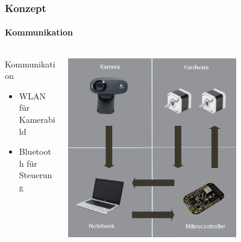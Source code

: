 \begin{frame}
    \frametitle{Konzept}
    \framesubtitle{Kommunikation}
    \begin{columns}
        \begin{column}{0.4\textwidth}
            \begin{block}{Kommunikation}
                \begin{itemize}
                    \item WLAN für Kamerabild
                    \item Bluetooth für Steuerung
                \end{itemize}
            \end{block}
        \end{column}
        \begin{column}{0.6\textwidth}
            \centering
            \includegraphics[width=0.7\textwidth]{../doc/fig/kommunikationsablauf.jpg}
        \end{column}
    \end{columns}
\end{frame}

